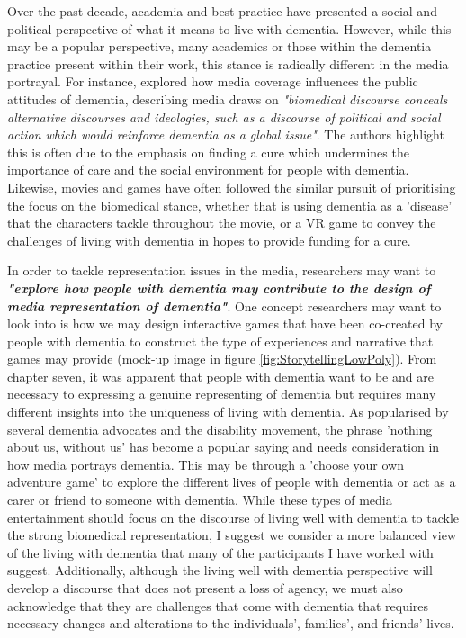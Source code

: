 Over the past decade, academia and best practice have presented a social and political perspective of what it means to live with dementia. However, while this may be a popular perspective, many academics or those within the dementia practice present within their work, this stance is radically different in the media portrayal. For instance, \cite{bailey2021battles} explored how media coverage influences the public attitudes of dementia, describing media draws on \textit{"biomedical discourse conceals alternative discourses and ideologies, such as a discourse of political and social action which would reinforce dementia as a global issue"}. The authors highlight this is often due to the emphasis on finding a cure which undermines the importance of care and the social environment for people with dementia. Likewise, movies and games have often followed the similar pursuit of prioritising the focus on the biomedical stance, whether that is using dementia as a 'disease' that the characters tackle throughout the movie, or a VR game to convey the challenges of living with dementia in hopes to provide funding for a cure.

In order to tackle representation issues in the media, researchers may want to \textit{\textbf{"explore how people with dementia may contribute to the design of media representation of dementia"}}. One concept researchers may want to look into is how we may design interactive games that have been co-created by people with dementia to construct the type of experiences and narrative that games may provide (mock-up image in figure \ref{fig:StorytellingLowPoly}). From chapter seven, it was apparent that people with dementia want to be and are necessary to expressing a genuine representing of dementia but requires many different insights into the uniqueness of living with dementia. As popularised by several dementia advocates and the disability movement, the phrase 'nothing about us, without us' \citep{spiel_nothing_2020} has become a popular saying and needs consideration in how media portrays dementia. This may be through a 'choose your own adventure game' to explore the different lives of people with dementia or act as a carer or friend to someone with dementia. While these types of media entertainment should focus on the discourse of living well with dementia to tackle the strong biomedical representation, I suggest we consider a more balanced view of the living with dementia that many of the participants I have worked with suggest. Additionally, although the living well with dementia perspective will develop a discourse that does not present a loss of agency, we must also acknowledge that they are challenges that come with dementia that requires necessary changes and alterations to the individuals', families', and friends' lives. 

